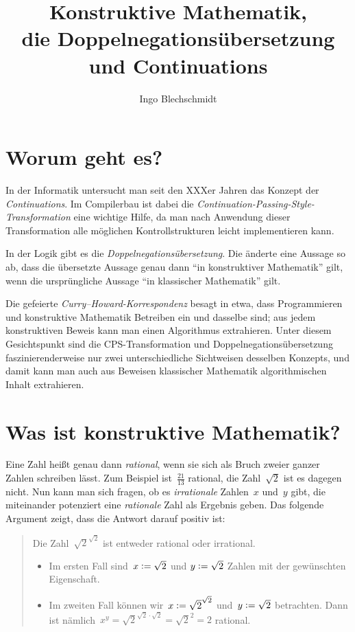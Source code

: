 \documentclass[a4paper,ngerman]{scrartcl}
\title{Konstruktive Mathematik, \\ die Doppelnegationsübersetzung \\ und Continuations}
\author{Ingo Blechschmidt}
\theoremstyle{plain}
\newcommand{\defeq}{\vcentcolon=}
\begin{document}
\maketitle

\section*{Worum geht es?}

In der Informatik untersucht man seit den XXXer Jahren das Konzept der
\emph{Continuations}. Im Compilerbau ist dabei die
\emph{Continuation-Passing-Style-Transformation} eine wichtige Hilfe, da man
nach Anwendung dieser Transformation alle möglichen Kontrollstrukturen leicht
implementieren kann.

In der Logik gibt es die \emph{Doppelnegationsübersetzung}. Die änderte eine
Aussage so ab, dass die übersetzte Aussage genau dann "`in konstruktiver
Mathematik"' gilt, wenn die ursprüngliche Aussage "`in klassischer Mathematik"'
gilt.

Die gefeierte \emph{Curry--Howard-Korrespondenz} besagt in etwa, dass
Programmieren und konstruktive Mathematik Betreiben ein und dasselbe sind; aus
jedem konstruktiven Beweis kann man einen Algorithmus extrahieren. Unter diesem
Gesichtspunkt sind die CPS-Transformation und Doppelnegationsübersetzung
faszinierenderweise nur zwei unterschiedliche
Sichtweisen desselben Konzepts, und damit kann man auch aus Beweisen
klassischer Mathematik algorithmischen Inhalt extrahieren.


\section*{Was ist konstruktive Mathematik?}

Eine Zahl heißt genau dann \emph{rational}, wenn sie sich als Bruch zweier
ganzer Zahlen schreiben lässt. Zum Beispiel ist~$\frac{21}{13}$ rational, die
Zahl~$\sqrt{2}$ ist es dagegen nicht. Nun kann man sich fragen, ob es
\emph{irrationale} Zahlen~$x$ und~$y$ gibt, die miteinander potenziert eine
\emph{rationale} Zahl als Ergebnis geben. Das folgende Argument zeigt, dass die
Antwort darauf positiv ist:
\enlargethispage{2em}

\begin{quote}
Die Zahl~$\sqrt{2}^{\sqrt{2}}$ ist entweder rational oder irrational.

\begin{itemize}
\item Im ersten Fall sind~$x \defeq \sqrt{2}$ und $y \defeq \sqrt{2}$ Zahlen
mit der gewünschten Eigenschaft.
\item Im zweiten Fall können wir~$x \defeq \sqrt{2}^{\sqrt{2}}$ und~$y \defeq
\sqrt{2}$ betrachten. Dann ist nämlich~$x^y = \sqrt{2}^{\sqrt{2} \cdot
\sqrt{2}} = \sqrt{2}^2 = 2$ rational.
\end{itemize}
\end{quote}
\end{document}
